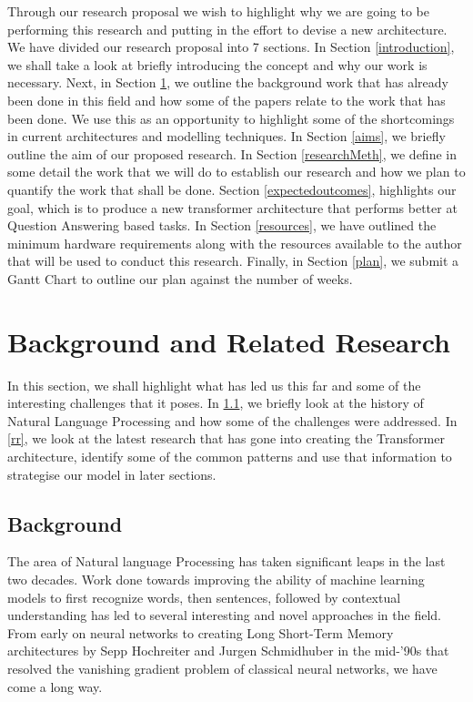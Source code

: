 \documentclass[11pt]{article}
\begin{document}
    Through our research proposal we wish to highlight why we are going to be performing this research and putting in the effort to devise a new architecture. We have divided our research proposal into 7 sections. In Section \ref{introduction}, we shall take a look at briefly introducing the concept and why our work is necessary. Next, in Section \ref{backRR}, we outline the background work that has already been done in this field and how some of the papers relate to the work that has been done. We use this as an opportunity to highlight some of the shortcomings in current architectures and modelling techniques. In Section \ref{aims}, we briefly outline the aim of our proposed research. In Section \ref{researchMeth}, we define in some detail the work that we will do to establish our research and how we plan to quantify the work that shall be done. Section \ref{expectedoutcomes}, highlights our goal, which is to produce a new transformer architecture that performs better at Question Answering based tasks.
	In Section \ref{resources}, we have outlined the minimum hardware requirements along with the resources available to the author that will be used to conduct this research. Finally, in Section \ref{plan}, we submit a Gantt Chart to outline our plan against the number of weeks.

	\section{Background and Related Research}\label{backRR}
	In this section, we shall highlight what has led us this far and some of the interesting challenges that it poses. In \ref{back}, we briefly look at the history of Natural Language Processing and how some of the challenges were addressed. In \ref{rr}, we look at the latest research that has gone into creating the Transformer architecture, identify some of the common patterns and use that information to strategise our model in later sections.

    \subsection{Background}\label{back}

	The area of Natural language Processing has taken significant leaps in the last two decades. Work done towards improving the ability of machine learning models to first recognize words, then sentences, followed by contextual understanding has led to several interesting and novel approaches in the field. From early on neural networks to creating Long Short-Term Memory architectures \citep{originallstm} by Sepp Hochreiter and Jurgen Schmidhuber in the mid-'90s that resolved the vanishing gradient problem of classical neural networks, we have come a long way.
\end{document}
